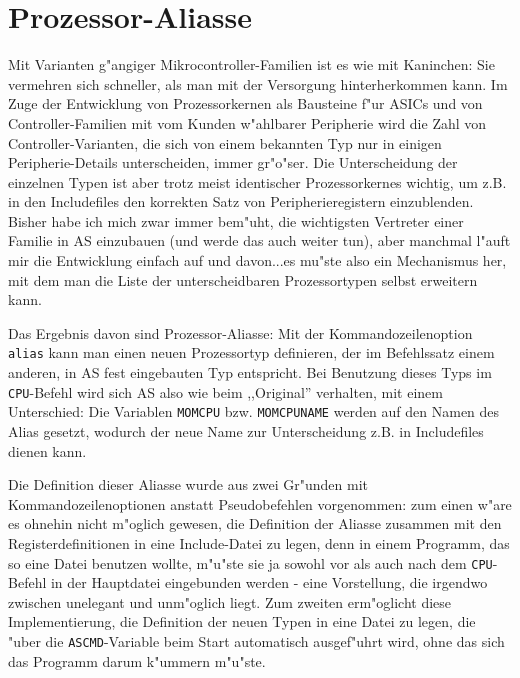 \documentclass[12pt,a4paper,twoside]{report}
\newcommand{\tty}[1]{{\tt #1}}
\begin{document}

\section{Prozessor-Aliasse}
\label{SectAlias}

Mit Varianten g"angiger Mikrocontroller-Familien ist es wie mit
Kaninchen: Sie vermehren sich schneller, als man mit der Versorgung
hinterherkommen kann.  Im Zuge der Entwicklung von Prozessorkernen als
Bausteine f"ur ASICs und von Controller-Familien mit vom Kunden w"ahlbarer
Peripherie wird die Zahl von Controller-Varianten, die sich von einem
bekannten Typ nur in einigen Peripherie-Details unterscheiden, immer
gr"o"ser.  Die Unterscheidung der einzelnen Typen ist aber trotz meist
identischer Prozessorkernes wichtig, um z.B. in den Includefiles den
korrekten Satz von Peripherieregistern einzublenden.  Bisher habe ich
mich zwar immer bem"uht, die wichtigsten Vertreter einer Familie in AS
einzubauen (und werde das auch weiter tun), aber manchmal l"auft mir
die Entwicklung einfach auf und davon...es mu"ste also ein Mechanismus
her, mit dem man die Liste der unterscheidbaren Prozessortypen selbst
erweitern kann.
\par
Das Ergebnis davon sind Prozessor-Aliasse: Mit der Kommandozeilenoption \tty{alias}
kann man einen neuen Prozessortyp definieren, der im Befehlssatz einem
anderen, in AS fest eingebauten Typ entspricht.  Bei Benutzung dieses
Typs im \tty{CPU}-Befehl wird sich AS also wie beim ,,Original'' verhalten,
mit einem Unterschied: Die Variablen \tty{MOMCPU} bzw. \tty{MOMCPUNAME}
werden auf den Namen des Alias gesetzt, wodurch der neue Name zur
Unterscheidung z.B. in Includefiles dienen kann.
\par
Die Definition dieser Aliasse wurde aus zwei Gr"unden mit
Kommandozeilenoptionen anstatt Pseudobefehlen vorgenommen: zum einen
w"are es ohnehin nicht m"oglich gewesen, die Definition der Aliasse
zusammen mit den Registerdefinitionen in eine Include-Datei zu legen, denn
in einem Programm, das so eine Datei benutzen wollte, m"u"ste sie ja sowohl
vor als auch nach dem \tty{CPU}-Befehl in der Hauptdatei eingebunden
werden - eine Vorstellung, die irgendwo zwischen unelegant und unm"oglich
liegt.  Zum zweiten erm"oglicht diese Implementierung, die Definition der
neuen Typen in eine Datei zu legen, die "uber die \tty{ASCMD}-Variable beim
Start automatisch ausgef"uhrt wird, ohne das sich das Programm darum
k"ummern m"u"ste.
\end{document}
